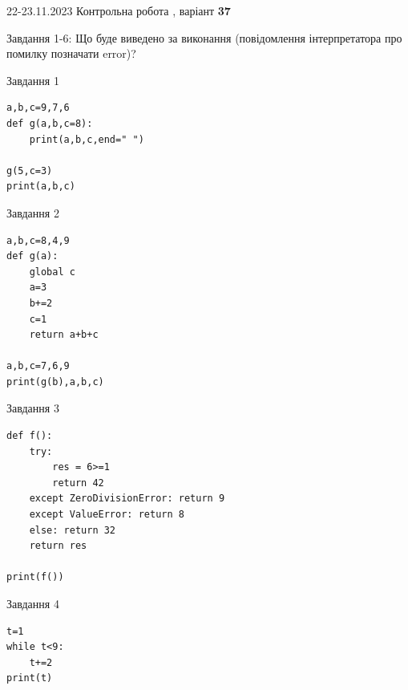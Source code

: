 \documentclass[12pt, ukrainian]{article}
\begin{document}
{{22-23.11.2023 Контрольна робота , варіант  \No \textbf { 37 }\par}}
{

Завдання 1-6: Що буде виведено за виконання (повідомлення інтерпретатора про помилку позначати error)?


\begin{minipage}[t]{9.7cm}                
{\begin{center}Завдання {1}\end{center}}
\begin{verbatim}
a,b,c=9,7,6
def g(a,b,c=8):
    print(a,b,c,end=" ")

g(5,c=3)
print(a,b,c)
\end{verbatim}     
\end{minipage}
\vline \hspace{8mm}
\begin{minipage}[t]{8.0cm}                
{\begin{center}Завдання {2}\end{center}}
\begin{verbatim}
a,b,c=8,4,9
def g(a):
    global c
    a=3
    b+=2
    c=1
    return a+b+c

a,b,c=7,6,9
print(g(b),a,b,c)
\end{verbatim}     
\end{minipage}

\vspace{15mm}
\begin{minipage}[t]{9.7cm}                
{\begin{center}Завдання {3}\end{center}}
\begin{verbatim}
def f():
    try:
        res = 6>=1
        return 42
    except ZeroDivisionError: return 9
    except ValueError: return 8
    else: return 32
    return res

print(f())
\end{verbatim}     
\end{minipage}
\vline \hspace{8mm}
\begin{minipage}[t]{8.0cm}                
{\begin{center}Завдання {4}\end{center}}
\begin{verbatim}
t=1
while t<9:
    t+=2
print(t)
\end{verbatim}     
\end{minipage}

}
\end{document}
